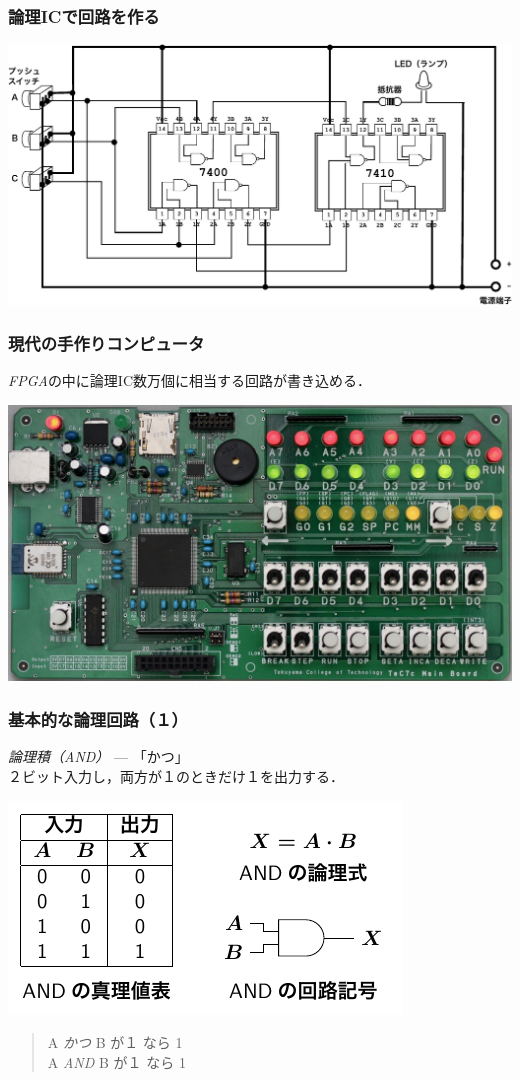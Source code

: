\documentclass{beamer}                 %
\begin{document}
\begin{frame}
  \frametitle{論理ICで回路を作る}
  \centerline{\includegraphics[scale=0.6]{../Keynote/majority-crop.pdf}}
\end{frame}

\begin{frame}
  \frametitle{現代の手作りコンピュータ}
  \emph{FPGA}の中に論理IC数万個に相当する回路が書き込める．
  \vfill
  \centerline{\includegraphics[scale=0.26]{../Img/TeC7c.jpg}}
\end{frame}

\begin{frame}
  \frametitle{基本的な論理回路（１）}
  \emph{論理積（AND）} --- 「かつ」\\
  \vfill
  ２ビット入力し，両方が１のときだけ１を出力する．
  \centerline{\includegraphics[scale=1.4]{../Tikz/and.pdf}}
  \begin{quote}
    A \emph{かつ} B が１ なら 1\\
    A \emph{AND} B が１ なら 1
  \end{quote}
  \vfill
\end{frame}
\end{document}
